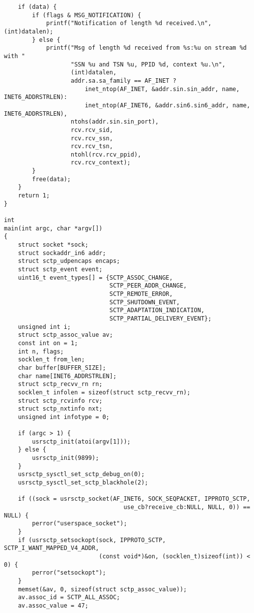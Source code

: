 \documentclass[a4paper]{article}
\begin{document}
\begin{verbatim}
    if (data) {
        if (flags & MSG_NOTIFICATION) {
            printf("Notification of length %d received.\n", (int)datalen);
        } else {
            printf("Msg of length %d received from %s:%u on stream %d with "
                   "SSN %u and TSN %u, PPID %d, context %u.\n",
                   (int)datalen,
                   addr.sa.sa_family == AF_INET ?
                       inet_ntop(AF_INET, &addr.sin.sin_addr, name, INET6_ADDRSTRLEN):
                       inet_ntop(AF_INET6, &addr.sin6.sin6_addr, name, INET6_ADDRSTRLEN),
                   ntohs(addr.sin.sin_port),
                   rcv.rcv_sid,
                   rcv.rcv_ssn,
                   rcv.rcv_tsn,
                   ntohl(rcv.rcv_ppid),
                   rcv.rcv_context);
        }
        free(data);
    }
    return 1;
}

int
main(int argc, char *argv[])
{
    struct socket *sock;
    struct sockaddr_in6 addr;
    struct sctp_udpencaps encaps;
    struct sctp_event event;
    uint16_t event_types[] = {SCTP_ASSOC_CHANGE,
	                          SCTP_PEER_ADDR_CHANGE,
	                          SCTP_REMOTE_ERROR,
	                          SCTP_SHUTDOWN_EVENT,
	                          SCTP_ADAPTATION_INDICATION,
	                          SCTP_PARTIAL_DELIVERY_EVENT};
    unsigned int i;
    struct sctp_assoc_value av;
    const int on = 1;
    int n, flags;
    socklen_t from_len;
    char buffer[BUFFER_SIZE];
    char name[INET6_ADDRSTRLEN];
    struct sctp_recvv_rn rn;
    socklen_t infolen = sizeof(struct sctp_recvv_rn);
    struct sctp_rcvinfo rcv;
    struct sctp_nxtinfo nxt;
    unsigned int infotype = 0;

    if (argc > 1) {
        usrsctp_init(atoi(argv[1]));
    } else {
        usrsctp_init(9899);
    }
    usrsctp_sysctl_set_sctp_debug_on(0);
    usrsctp_sysctl_set_sctp_blackhole(2);

    if ((sock = usrsctp_socket(AF_INET6, SOCK_SEQPACKET, IPPROTO_SCTP, 
    	                          use_cb?receive_cb:NULL, NULL, 0)) == NULL) {
        perror("userspace_socket");
    }
    if (usrsctp_setsockopt(sock, IPPROTO_SCTP, SCTP_I_WANT_MAPPED_V4_ADDR, 
                           (const void*)&on, (socklen_t)sizeof(int)) < 0) {
        perror("setsockopt");
    }
    memset(&av, 0, sizeof(struct sctp_assoc_value));
    av.assoc_id = SCTP_ALL_ASSOC;
    av.assoc_value = 47;


\end{verbatim}
\end{document}
